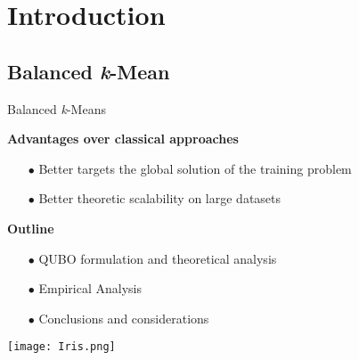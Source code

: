 \section{Introduction}

\subsection{Balanced \textit{k}-Mean}
	\begin{frame}{Balanced \textit{k}-Means} %
		\begin{minipage}{0.5\textwidth} %
			\textbf{Advantages over classical approaches}
			\begin{itemize}
				\item[$\bullet$] Better targets the global solution of the training problem  
				\item[$\bullet$] Better theoretic scalability on large datasets
			\end{itemize}
		\end{minipage}\hfill
		\begin{minipage}{0.5\textwidth}
			\textbf{Outline}
			\begin{itemize}
				\item[$\bullet$] QUBO formulation and theoretical analysis
				\item[$\bullet$] Empirical Analysis 
				\item[$\bullet$] Conclusions and considerations
			\end{itemize}
		\end{minipage}\hfill
		\texttt{[image: Iris.png]}
	\end{frame}
	


